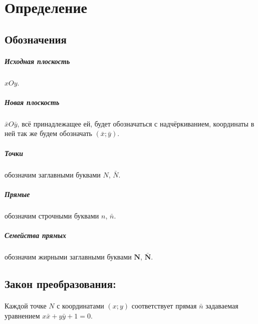 \section{Определение}


\subsection{Обозначения}
\subparagraph{Исходная плоскость} $xOy$.
\subparagraph{Новая плоскость} $\bar{x}O\bar{y}$, всё принадлежащее ей, будет обозначаться с надчёркиванием, координаты в ней так же будем обозначать $(\bar{x}; \bar{y})$.
\subparagraph{Точки} обозначим заглавными буквами $N$, $\bar{N}$.
\subparagraph{Прямые} обозначим строчными буквами $n$, $\bar{n}$.
\subparagraph{Семейства прямых} обозначим жирными заглавными буквами $\mathbf{N}$, $\mathbf{\bar{N}}$.

\subsection{Закон преобразования:}
\paragraph{}Каждой точке $N$ с координатами $(x; y)$ соответствует прямая $\bar{n}$ задаваемая уравнением $x\bar{x} + y\bar{y} + 1 = 0$.